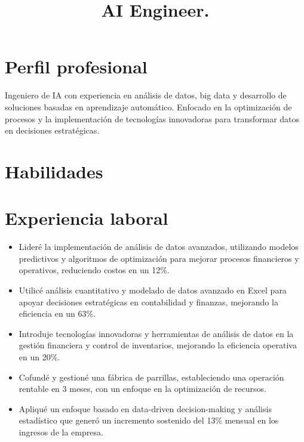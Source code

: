 \documentclass[11pt,a4paper]{moderncv}
\title{AI Engineer.} %
\begin{document}
\makecvtitle

\section{Perfil profesional}
Ingeniero de IA con experiencia en análisis de datos, big data y desarrollo de soluciones basadas en aprendizaje automático. Enfocado en la optimización de procesos y la implementación de tecnologías innovadoras para transformar datos en decisiones estratégicas.
\section{Habilidades}

\section{Experiencia laboral}
%
{
  \begin{itemize} %
    \item Lideré la implementación de análisis de datos avanzados, utilizando modelos predictivos y algoritmos de optimización para mejorar procesos financieros y operativos, reduciendo costos en un 12\%.
    \item Utilicé análisis cuantitativo y modelado de datos avanzado en Excel para apoyar decisiones estratégicas en contabilidad y finanzas, mejorando la eficiencia en un 63\%.
    \item Introduje tecnologías innovadoras y herramientas de análisis de datos en la gestión financiera y control de inventarios, mejorando la eficiencia operativa en un 20\%.
    \item Cofundé y gestioné una fábrica de parrillas, estableciendo una operación rentable en 3 meses, con un enfoque en la optimización de recursos.
    \item Apliqué un enfoque basado en data-driven decision-making y análisis estadístico que generó un incremento sostenido del 13\% mensual en los ingresos de la empresa.
  \end{itemize}
}
\end{document}
